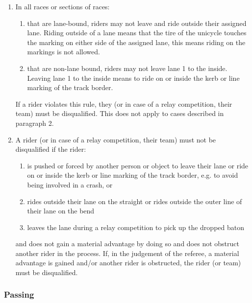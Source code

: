 \begin{enumerate}[leftmargin=1.5em,labelsep=*]
	\item In all races or sections of races:
	\begin{enumerate}[label*=\arabic*, leftmargin=1.5em,labelsep=*]
		\item that are lane-bound, riders may not leave and ride outside their assigned lane.
				Riding outside of a lane means that the tire of the unicycle touches the marking on either
        side of the assigned lane, this means riding on the markings is not allowed.
		\item that are non-lane bound, riders may not leave lane 1 to the inside.
				Leaving lane 1 to the inside means to ride on or inside the kerb or line marking of the track border.
	\end{enumerate}
	If a rider violates this rule, they (or in case of a relay competition, their team) must be disqualified. 
  This does not apply to cases described in paragraph 2.
	
	\item A rider (or in case of a relay competition, their team) must not be disqualified if the rider:
	\begin{enumerate}[label*=\arabic*,leftmargin=1.5em,labelsep=*]
		\item is pushed or forced by another person or object to leave their lane or ride on or inside the 
      kerb or line marking of the track border, e.g. to avoid being involved in a crash, or
		\item rides outside their lane on the straight or rides outside the outer line of their lane on the bend
		\item leaves the lane during a relay competition to pick up the dropped baton
	\end{enumerate}
	and does not gain a material advantage by doing so and does not obstruct another rider in the process.
	If, in the judgement of the referee, a material advantage is gained and/or another rider is obstructed, 
  the rider (or team) must be disqualified.
\end{enumerate}

\subsubsection{Passing\label{subsubsec:track_passing}}

